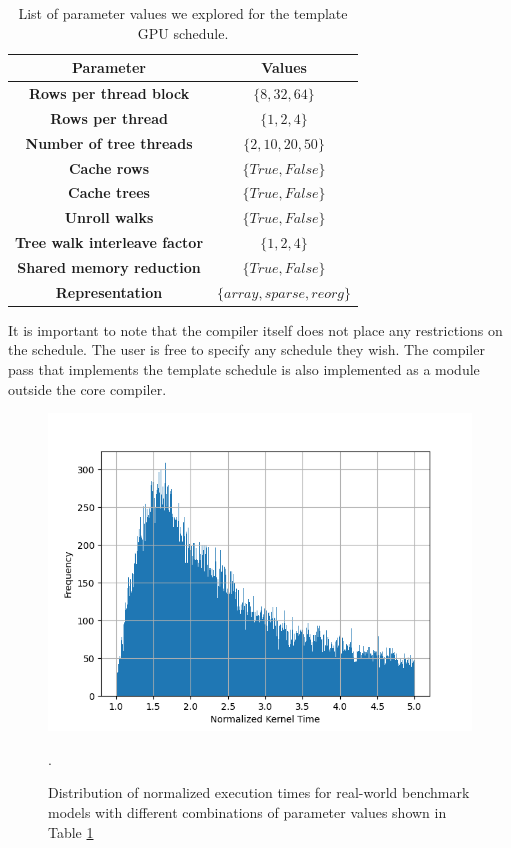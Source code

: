 \begin{table}[htb]
  \footnotesize
  \centering
  \begin{tabularx}{\linewidth}{c | c }
    \toprule
    \textbf{Parameter} & \textbf{Values} \\
    \midrule
    \textbf{Rows per thread block} & $\{8, 32, 64\}$ \\
    \textbf{Rows per thread} & $\{1, 2, 4\}$ \\
    \textbf{Number of tree threads} & $\{2, 10, 20, 50\}$ \\
    \textbf{Cache rows} & $\{True, False\}$ \\
    \textbf{Cache trees} & $\{True, False\}$ \\
    \textbf{Unroll walks} & $\{True, False\}$ \\
    \textbf{Tree walk interleave factor} & $\{1, 2, 4\}$ \\
    \textbf{Shared memory reduction} & $\{True, False\}$ \\
    \textbf{Representation} & $\{array, sparse, reorg\}$ \\
    \bottomrule
  \end{tabularx}
  \vskip 5pt
  \caption{\label{tab:schedparams} List of parameter values we explored for the template GPU schedule.}
\end{table}

It is important to note that the \Treebeard{} compiler itself does not place any 
restrictions on the schedule. The user is free to specify any schedule they wish.
The compiler pass that implements the template schedule is also implemented as a 
module outside the core \Treebeard{} compiler. 

\begin{figure}[htb]
  \centering
  \includegraphics[width=0.85\linewidth]{figures/normalized_kernel_histogram_lt5.png}
  \caption{Distribution of normalized execution times for real-world benchmark models
  with different combinations of parameter values shown in Table \ref{tab:schedparams}}. 
  \label{Fig:ExecTimeDistribution}
\end{figure}

